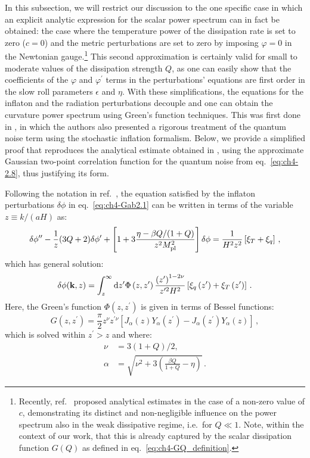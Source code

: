 In this subsection, we will restrict our discussion to the one specific case in which  an explicit analytic expression for the scalar power spectrum can in fact be obtained: the case where  the temperature power of the dissipation rate is set to zero ($c=0$) and  the metric perturbations are set to zero by imposing $\varphi=0$ in the Newtonian gauge.\footnote{Recently, ref.~\cite{Ballesteros:2023dno} proposed analytical estimates in the case of a non-zero value of $c$, demonstrating its distinct and non-negligible influence on the power spectrum also in the weak dissipative regime, i.e.\ for $Q\ll 1$. Note, within the context of our work, that this is already captured by the scalar dissipation function $G(Q)$ as defined in eq.~\eqref{eq:ch4-GQ_definition}.} This second approximation is certainly valid for small to moderate values of the dissipation strength $Q$, as one can easily show that the coefficients of the $\varphi$ and $\varphi^\prime$ terms in the perturbations' equations are first order in the slow roll parameters $\epsilon$ and $\eta$. With these simplifications, the equations for the inflaton and the radiation perturbations decouple and one can obtain the curvature power spectrum using Green's function techniques. This was first done in \cite{Ramos:2013nsa}, in which the authors also presented a rigorous treatment of the quantum noise term using the stochastic inflation formalism. Below, we provide a simplified proof that reproduces the analytical estimate obtained in \cite{Ramos:2013nsa}, using the approximate Gaussian two-point correlation function for the quantum noise from eq.~\eqref{eq:ch4-2.8}, thus justifying its form.

Following the notation in ref.~\cite{Ramos:2013nsa}, the equation satisfied by the inflaton perturbations $\delta\phi$ in eq.~\eqref{eq:ch4-Gab2.1} can be written in terms of the variable $z\equiv k/(aH)$ as:
\begin{equation}
    \delta \phi^{\prime \prime}-\frac{1}{z}(3 Q+2) \delta \phi^{\prime}+\left[1+3 \frac{\eta-\beta Q /(1+Q)}{z^2 M_{\rm{pl}}^2}\right] \delta \phi =\frac{1}{H^2 z^2}\left[\xi_T+\xi_q\right]\,, \label{eq2:ch4-Gab5}
\end{equation}
which has general solution:
\begin{equation}
    \delta \phi(\mathbf{k}, z)=\int_z^{\infty} {\rm d} z^{\prime} \Phi\left(z, z^{\prime}\right) \frac{\left(z^{\prime}\right)^{1-2 \nu}}{z^{\prime 2} H^2}\left[\xi_q\left(z^{\prime}\right)+\xi_T\left(z^{\prime}\right)\right]\,. \label{eq:ch4-dphi1}
\end{equation}
Here, the Green's function $\Phi(z,z^\prime)$ is given in terms of Bessel functions:
\begin{equation}
    G\left(z, z^{\prime}\right)=\frac{\pi}{2} z^\nu z^{\prime \nu}\left[J_\alpha(z) Y_\alpha\left(z^{\prime}\right)-J_\alpha\left(z^{\prime}\right) Y_\alpha(z)\right]\,,
\end{equation}
which is solved within $z^\prime > z$ and where:
\begin{align}
    \nu & =3(1+Q) / 2, \label{eq:ch4-nu}\\
    \alpha & =\sqrt{\nu^2+3\left(\frac{ \beta
Q}{1+Q}- \eta\right)}\,. \label{eq:ch4-alpha}
\end{align}

